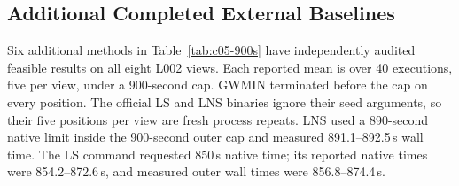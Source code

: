 \subsection{Additional Completed External Baselines}

Six additional methods in Table~\ref{tab:c05-900s} have independently
audited feasible results on all eight L002 views.
Each reported mean is over 40 executions, five per view, under a 900-second
cap. GWMIN terminated before the cap on every position. The official LS and
LNS binaries ignore their seed arguments, so their five positions per view
are fresh process repeats. LNS used a 890-second native limit inside the
900-second outer cap and measured 891.1--892.5\,s wall time. The LS command
requested 850\,s native time; its reported native times were 854.2--872.6\,s,
and measured outer wall times were 856.8--874.4\,s.

